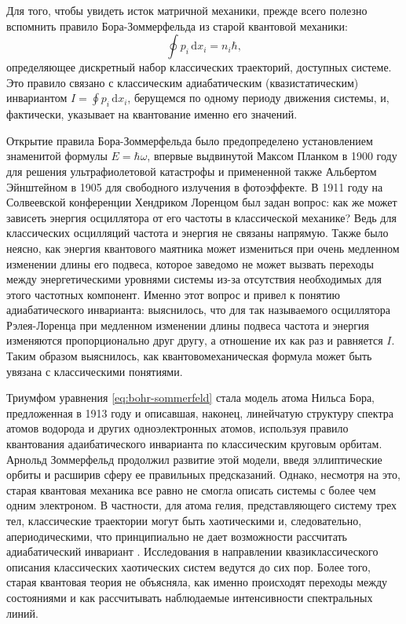 \documentclass[14pt, a4paper]{extreport}
\newcommand{\diff}{\,\mathrm{d}}
\numberwithin{equation}{section}
\begin{document}
Для того, чтобы увидеть исток матричной механики, прежде всего полезно вспомнить правило Бора-Зоммерфельда из старой квантовой механики:
\begin{equation}
	\oint p_i \diff x_i = n_i \hbar, \label{eq:bohr-sommerfeld}
\end{equation}
определяющее дискретный набор классических траекторий, доступных системе. Это правило связано с классическим адиабатическим (квазистатическим) инвариантом $I = \oint p_i \diff x_i$, берущемся по одному периоду движения системы, и, фактически, указывает на квантование именно его значений. 

Открытие правила Бора-Зоммерфельда было предопределено установлением знаменитой формулы $E = \hbar \omega$, впервые выдвинутой Максом Планком в 1900 году для решения ультрафиолетовой катастрофы и примененной также Альбертом Эйнштейном в 1905 для свободного излучения в фотоэффекте. В 1911 году на Солвеевской конференции Хендриком Лоренцом был задан вопрос: как же может зависеть энергия осциллятора от его частоты в классической механике? Ведь для классических осцилляций частота и энергия не связаны напрямую. Также было неясно, как энергия квантового маятника может измениться при очень медленном изменении длины его подвеса, которое заведомо не может вызвать переходы между энергетическими уровнями системы из-за отсутствия необходимых для этого частотных компонент. Именно этот вопрос и привел к понятию адиабатического инварианта: выяснилось, что для так называемого осциллятора Рэлея-Лоренца при медленном изменении длины подвеса частота и энергия изменяются пропорционально друг другу, а отношение их как раз и равняется $I$. Таким образом выяснилось, как квантовомеханическая формула может быть увязана с классическими понятиями.

Триумфом уравнения \eqref{eq:bohr-sommerfeld} стала модель атома Нильса Бора, предложенная в 1913 году и описавшая, наконец, линейчатую структуру спектра атомов водорода и других одноэлектронных атомов, используя правило квантования адаибатического инварианта по классическим круговым орбитам. Арнольд Зоммерфельд продолжил развитие этой модели, введя эллиптические орбиты и расширив сферу ее правильных предсказаний. Однако, несмотря на это, старая квантовая механика все равно не смогла описать системы с более чем одним электроном. В частности, для атома гелия, представляющего систему трех тел, классические траектории могут быть хаотическими и, следовательно, апериодическими, что принципиально не дает возможности рассчитать адиабатический инвариант \cite{wintgen1992semiclassical}. Исследования в направлении квазиклассического описания классических хаотических систем ведутся до сих пор. Более того, старая квантовая теория не объясняла, как именно происходят переходы между состояниями и как рассчитывать наблюдаемые интенсивности спектральных линий.
\end{document}
